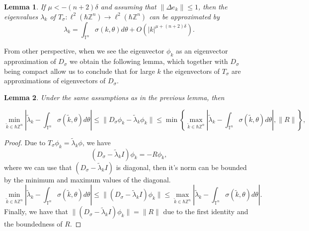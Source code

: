 \documentclass[pdflatex,sn-mathphys-num]{sn-jnl}%
\theoremstyle{thmstyleone}%
\newtheorem{lemma}{Lemma}
\theoremstyle{thmstyletwo}%
\theoremstyle{thmstylethree}%
\begin{document}
\begin{lemma} If $\mu<-(n+2)\delta$ and assuming that $\|\Delta e_k\|\leq 1 $, then the eigenvalues $\lambda_k$ of $T_\sigma:\ell^{2}(\hbar\mathbb{Z}^n)\to\ell^{2}(\hbar\mathbb{Z}^n)$ can be approximated by 
\[ \lambda_k=\int_{\mathbb{T}^n} \sigma(k,\theta)d\theta + O(|k|^{\mu+(n+2)\delta}).\]
\end{lemma}
From other perspective, when we see the eigenvector $\phi_k$ as an eigenvector approximation of $D_\sigma$ we obtain the following lemma, which together with $D_\sigma$ being compact allow us to conclude that for large $k$ the eigenvectors of $T_\sigma$ are approximations of eigenvectors of $D_\sigma$.
\begin{lemma} Under the same assumptions as in the previous lemma, then 

\begin{equation} 
\min_{\widetilde{k}\in\hbar\mathbb{Z}^n} \left|\widetilde{\lambda}_k-\int_{\mathbb{T}^n} \sigma(\widetilde{k},\theta) d\theta  \right| \leq  \|D_\sigma\phi_k - \widetilde{\lambda}_k\phi_k\|\leq \min \left\{\max_{\widetilde{k}\in\hbar\mathbb{Z}^n} \left|\widetilde{\lambda}_k-\int_{\mathbb{T}^n} \sigma(\widetilde{k},\theta) d\theta  \right|,\|R\|\right\},
\end{equation}
\end{lemma}
\begin{proof}
Due to $T_\sigma\phi_k=\widetilde{\lambda}_k\phi$, we have 
    \[(D_\sigma - \widetilde{\lambda}_kI)\phi_k=-R\phi_k, \]
where we can use that $(D_\sigma - \widetilde{\lambda}_kI)$ is diagonal, then it's norm can be bounded by the minimum and maximum values of the diagonal. 
\[\min_{\widetilde{k}\in\hbar\mathbb{Z}^n} \left|\widetilde{\lambda}_k-\int_{\mathbb{T}^n} \sigma(\widetilde{k},\theta) d\theta  \right| \leq  \|(D_\sigma - \widetilde{\lambda}_kI)\phi_k\|\leq \max_{\widetilde{k}\in\hbar\mathbb{Z}^n} \left|\widetilde{\lambda}_k-\int_{\mathbb{T}^n} \sigma(\widetilde{k},\theta) d\theta  \right|.\]
Finally, we have that $\|(D_\sigma - \widetilde{\lambda}_kI)\phi_k\|=\|R\|$ due to the first identity and the boundedness of $R$. 
\end{proof}
\end{document}
